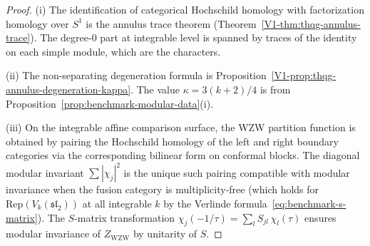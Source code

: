 \begin{proof}
(i) The identification of categorical Hochschild homology with factorization
homology over $S^1$ is the annulus trace theorem
(Theorem~\ref*{V1-thm:thqg-annulus-trace}). The degree-$0$ part
at integrable level is spanned by traces of the identity on
each simple module, which are the characters.

(ii) The non-separating degeneration formula is
Proposition~\ref*{V1-prop:thqg-annulus-degeneration-kappa}.
The value $\kappa = 3(k+2)/4$ is from
Proposition~\ref{prop:benchmark-modular-data}(i).

(iii) On the integrable affine comparison surface, the WZW
partition function is obtained by pairing the Hochschild
homology of the left and right boundary categories via the
corresponding bilinear form on conformal blocks. The diagonal
modular invariant $\sum |\chi_j|^2$ is the unique such pairing
compatible with modular invariance when the fusion category
is multiplicity-free (which holds for
$\mathrm{Rep}(V_k(\mathfrak{sl}_2))$ at all integrable $k$
by the Verlinde formula~\eqref{eq:benchmark-s-matrix}).
The $S$-matrix transformation $\chi_j(-1/\tau)
= \sum_l S_{jl}\, \chi_l(\tau)$ ensures modular invariance
of $Z_{\mathrm{WZW}}$ by unitarity of $S$.
\end{proof}

